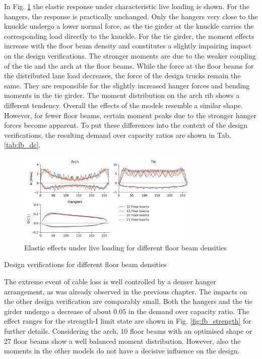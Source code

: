 In Fig. \ref{fig:fb_live} the elastic response under characteristic live loading is shown. For the hangers, the response is practically unchanged. Only the hangers very close to the knuckle undergo a lower normal force, as the tie girder at the knuckle carries the corresponding load directly to the knuckle. For the tie girder, the moment effects increase with the floor beam density and constitutes a slightly impairing impact on the design verifications. The stronger moments are due to the weaker coupling of the tie and the arch at the floor beams. While the force at the floor beams for the distributed lane load decreases, the force of the design trucks remain the same. They are responsible for the slightly increased hanger forces and bending moments in the tie girder. The moment distribution on the arch rib shows a different tendency. Overall the effects of the models resemble a similar shape. However, for fewer floor beams, certain moment peaks due to the stronger hanger forces become apparent. To put these differences into the context of the design verifications, the resulting demand over capacity ratios are shown in Tab. \ref{tab:fb_dc}.

\begin{figure}
    \centering
    \includegraphics[trim={0 0.4cm 0 0.4cm},clip, width=0.78\textwidth]{calculations/floor beam comparison/live loading.png}
    \caption{Elastic effects under live loading for different floor beam densities}
    \label{fig:fb_live}
\end{figure}

\begin{table}[H]
    \centering
    \resizebox{\columnwidth}{!}{%
    
    }
    \caption{Design verifications for different floor beam densities}
    \label{tab:fb_dc}
\end{table}

The extreme event of cable loss is well controlled by a denser hanger arrangement, as was already observed in the previous chapter. The impacts on the other design verification are comparably small. Both the hangers and the tie girder undergo a decrease of about 0.05 in the demand over capacity ratio. The effect ranges for the strength-I limit state are shown in Fig. \ref{fig:fb_strength} for further details. Considering the arch, 10 floor beams with an optimised shape or 27 floor beams show a well balanced moment distribution. However, also the moments in the other models do not have a decisive influence on the design.

